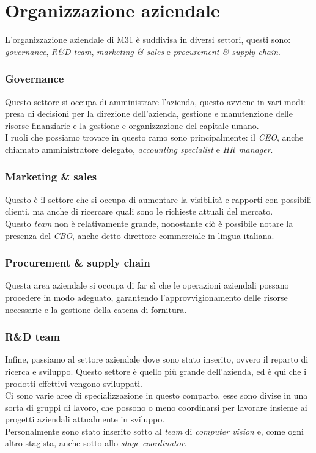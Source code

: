 \section{Organizzazione aziendale}\label{sec:company-organization}\noindent
L'organizzazione aziendale di M31 è suddivisa in diversi settori, questi sono: \textit{governance}, \textit{R\&D team}, \textit{marketing \& sales} e \textit{procurement \& supply chain}.
\subsubsection*{Governance}\noindent
Questo settore si occupa di amministrare l'azienda, questo avviene in vari modi: presa di decisioni per la direzione dell'azienda, gestione e manutenzione delle risorse finanziarie e la gestione e organizzazione del capitale umano.\\
I ruoli che possiamo trovare in questo ramo sono principalmente: il \textit{CEO}, anche chiamato amministratore delegato, \textit{accounting specialist} e \textit{HR manager}.
\subsubsection*{Marketing \& sales}\noindent
Questo è il settore che si occupa di aumentare la visibilità e rapporti con possibili clienti, ma anche di ricercare quali sono le richieste attuali del mercato.\\
Questo \textit{team} non è relativamente grande, nonostante ciò è possibile notare la presenza del \textit{CBO}, anche detto direttore commerciale in lingua italiana.
\subsubsection*{Procurement \& supply chain}\noindent
Questa area aziendale si occupa di far sì che le operazioni aziendali possano procedere in modo adeguato, garantendo l'approvvigionamento delle risorse necessarie e la gestione della catena di fornitura.
\subsubsection*{R\&D team}\noindent
Infine, passiamo al settore aziendale dove sono stato inserito, ovvero il reparto di ricerca e sviluppo. Questo settore è quello più grande dell'azienda, ed è qui che i prodotti effettivi vengono sviluppati.\\
Ci sono varie aree di specializzazione in questo comparto, esse sono divise in una sorta di gruppi di lavoro, che possono o meno coordinarsi per lavorare insieme ai progetti aziendali attualmente in sviluppo.\\
Personalmente sono stato inserito sotto al \textit{team} di \textit{computer vision} e, come ogni altro stagista, anche sotto allo \textit{stage coordinator}.

